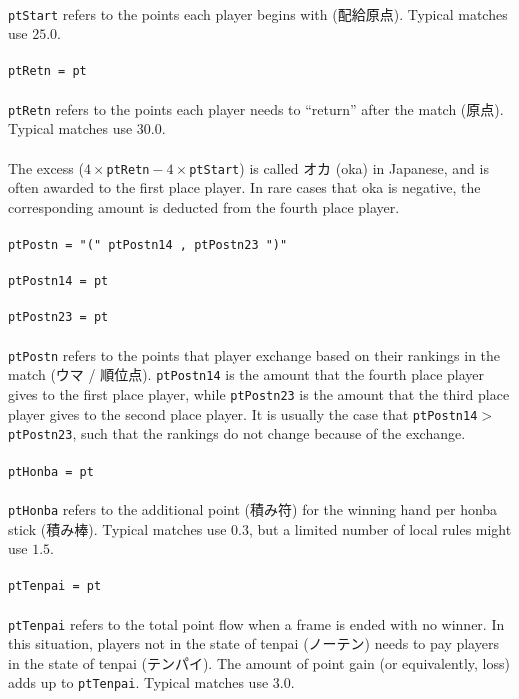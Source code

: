 \documentclass[%
	a4paper%
	,10pt%
	,twoside%
	,notitlepage%
]{article}%
\newcommand*{\ruleSymbol}{\textjapanese{⚠}}%
\newcommand*{\ruleMargin}{\marginpar{\flushright{}\ruleSymbol{}}}%
\newcommand*{\rulePar}{\paragraph*{\ruleMargin{}}}%
\begin{document}
			\paragraph*{}\lstinline/ptStart/ refers to the points each player begins with (\textjapanese{配給原点}). Typical matches use $25.0$. %
			\rulePar{}\lstinline/ptRetn = pt/%
			\paragraph*{}\lstinline/ptRetn/ refers to the points each player needs to ``return'' after the match (\textjapanese{原点}). Typical matches use $30.0$. %
			\paragraph*{}The excess ($4 \times{} {}$\lstinline/ptRetn/${} - 4 \times{} {}$\lstinline/ptStart/) is called \textjapanese{オカ} (oka) in Japanese, and is often awarded to the first place player. In rare cases that oka is negative, the corresponding amount is deducted from the fourth place player. %
			\rulePar{}\lstinline/ptPostn = "(" ptPostn14 , ptPostn23 ")"/%
			\rulePar{}\lstinline/ptPostn14 = pt/%
			\rulePar{}\lstinline/ptPostn23 = pt/%
			\paragraph*{}\lstinline/ptPostn/ refers to the points that player exchange based on their rankings in the match (\textjapanese{ウマ} / \textjapanese{順位点}). \lstinline/ptPostn14/ is the amount that the fourth place player gives to the first place player, while \lstinline/ptPostn23/ is the amount that the third place player gives to the second place player. It is usually the case that \lstinline/ptPostn14/${} > {}$\lstinline/ptPostn23/, such that the rankings do not change because of the exchange. %
			\rulePar{}\lstinline/ptHonba = pt/%
			\paragraph*{}\lstinline/ptHonba/ refers to the additional point (\textjapanese{積み符}) for the winning hand per honba stick (\textjapanese{積み棒}). Typical matches use $0.3$, but a limited number of local rules might use $1.5$. %
			\rulePar{}\lstinline/ptTenpai = pt/%
			\paragraph*{}\lstinline/ptTenpai/ refers to the total point flow when a frame is ended with no winner. In this situation, players not in the state of tenpai (\textjapanese{ノーテン}) needs to pay players in the state of tenpai (\textjapanese{テンパイ}). The amount of point gain (or equivalently, loss) adds up to \lstinline/ptTenpai/. Typical matches use $3.0$. %
\end{document}
